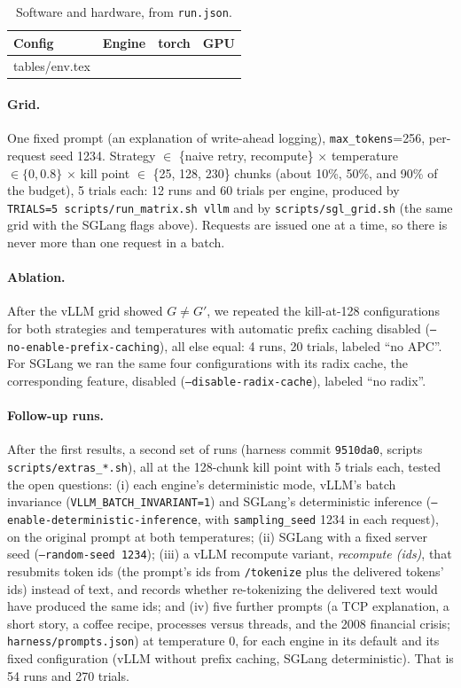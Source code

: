 \documentclass[10pt,twocolumn]{article}
\makeatletter
\def\EnvRows{\@@input tables/env.tex }
\makeatother
\begin{document}
\begin{table}[t]
\centering\small
\caption{Software and hardware, from \texttt{run.json}.}
\label{tab:env}
\begin{tabular}{@{}llll@{}}
\toprule
Config & Engine & torch & GPU \\
\midrule
\EnvRows
\bottomrule
\end{tabular}
\end{table}
\noindent{\small\par}

\paragraph{Grid.} One fixed prompt (an explanation of write-ahead logging),
\texttt{max\_tokens}=256, per-request seed 1234. Strategy $\in$ \{naive
retry, recompute\} $\times$ temperature $\in \{0, 0.8\}$ $\times$ kill point
$\in$ \{25, 128, 230\} chunks (about 10\%, 50\%, and 90\% of the budget),
5 trials each: 12 runs and 60 trials per engine, produced by
\texttt{TRIALS=5 scripts/run\_matrix.sh vllm} and by
\texttt{scripts/sgl\_grid.sh} (the same grid with the SGLang flags above). Requests are issued one at a
time, so there is never more than one request in a batch.

\paragraph{Ablation.} After the vLLM grid showed $G\neq G'$, we repeated the
kill-at-128 configurations for both strategies and temperatures with
automatic prefix caching disabled (\texttt{--no-enable-prefix-caching}), all
else equal: 4 runs, 20 trials, labeled ``no APC''. For SGLang we ran the
same four configurations with its radix cache, the corresponding feature,
disabled (\texttt{--disable-radix-cache}), labeled ``no radix''.

\paragraph{Follow-up runs.} After the first results, a second set of runs
(harness commit \texttt{9510da0}, scripts \texttt{scripts/extras\_*.sh}),
all at the 128-chunk kill point with 5 trials each, tested the open
questions: (i) each engine's deterministic mode, vLLM's batch invariance
(\texttt{VLLM\_BATCH\_INVARIANT=1}) and SGLang's deterministic inference
(\texttt{--enable-deterministic-inference}, with \texttt{sampling\_seed}
1234 in each request), on the original prompt at both temperatures;
(ii) SGLang with a fixed server seed (\texttt{--random-seed 1234});
(iii) a vLLM recompute variant, \emph{recompute (ids)}, that resubmits token
ids (the prompt's ids from \texttt{/tokenize} plus the delivered tokens'
ids) instead of text, and records whether re-tokenizing the delivered text
would have produced the same ids; and (iv) five further prompts (a TCP
explanation, a short story, a coffee recipe, processes versus threads, and
the 2008 financial crisis; \texttt{harness/prompts.json}) at temperature 0,
for each engine in its default and its fixed configuration (vLLM without
prefix caching, SGLang deterministic). That is 54 runs and 270 trials.
\end{document}
